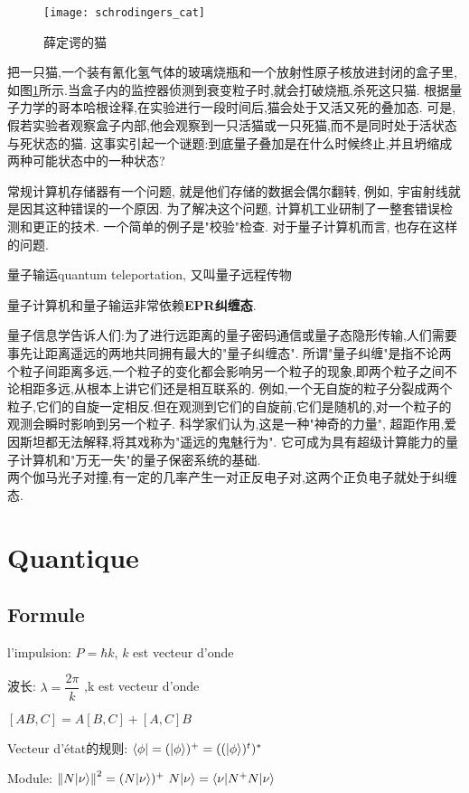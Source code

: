 \begin{figure}[htbp]
		\centering
		\texttt{[image: schrodingers\_cat]}
		\caption{薛定谔的猫}
		\label{fig.cat}
\end{figure}
把一只猫,一个装有氰化氢气体的玻璃烧瓶和一个放射性原子核放进封闭的盒子里, 如图\ref{fig.cat}所示.当盒子内的监控器侦测到衰变粒子时,就会打破烧瓶,杀死这只猫.
根据量子力学的哥本哈根诠释,在实验进行一段时间后,猫会处于又活又死的叠加态.
可是,假若实验者观察盒子内部,他会观察到一只活猫或一只死猫,而不是同时处于活状态与死状态的猫.
这事实引起一个谜题:到底量子叠加是在什么时候终止,并且坍缩成两种可能状态中的一种状态?

常规计算机存储器有一个问题, 就是他们存储的数据会偶尔翻转, 例如, 宇宙射线就是因其这种错误的一个原因. 为了解决这个问题, 计算机工业研制了一整套错误检测和更正的技术. 一个简单的例子是"校验"检查. 对于量子计算机而言, 也存在这样的问题.

量子输运quantum teleportation, 又叫量子远程传物

量子计算机和量子输运非常依赖\textbf{EPR纠缠态}.

量子信息学告诉人们:为了进行远距离的量子密码通信或量子态隐形传输,人们需要事先让距离遥远的两地共同拥有最大的"量子纠缠态".
所谓"量子纠缠"是指不论两个粒子间距离多远,一个粒子的变化都会影响另一个粒子的现象,即两个粒子之间不论相距多远,从根本上讲它们还是相互联系的.
例如,一个无自旋的粒子分裂成两个粒子,它们的自旋一定相反.但在观测到它们的自旋前,它们是随机的,对一个粒子的观测会瞬时影响到另一个粒子.
科学家们认为,这是一种"神奇的力量", 超距作用,爱因斯坦都无法解释,将其戏称为"遥远的鬼魅行为".
它可成为具有超级计算能力的量子计算机和"万无一失"的量子保密系统的基础.\\
两个伽马光子对撞,有一定的几率产生一对正反电子对,这两个正负电子就处于纠缠态.
\chapter{Quantique}
\section{Formule}
l'impulsion: $P = \hbar k$, $k$ est vecteur d'onde

波长: $\lambda = \dfrac{2\pi}{k}$ ,k est vecteur d'onde

$[AB,C] = A[B,C] + [A,C]B$

Vecteur d'\'etat的规则: $\langle \phi| = (|\phi\rangle)^+ = ((|\phi\rangle)^t)^*$

Module: $\left\Vert N|\nu\rangle\right\Vert^2 = (N |\nu\rangle)^+ \ N |\nu\rangle = \langle\nu|N^+ N|\nu\rangle$

